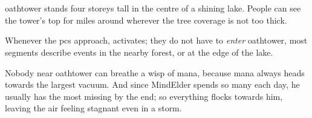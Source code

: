\section{}
\label{oathtower}

\Gls{oathtower} stands four storeys tall in the centre of a shining lake.
People can see the tower's top for miles around wherever the tree coverage is not too thick.

Whenever the \glspl{pc} approach,  activates; they do not have to \emph{enter} \gls{oathtower}, most \glspl{segment} describe events in the nearby forest, or at the edge of the lake.

Nobody near \gls{oathtower} can breathe a wisp of mana, because mana always heads towards the largest vacuum.
And since \gls{MindElder} spends so many  each day, he usually has the most missing by the end; so everything flocks towards him, leaving the air feeling stagnant even in a storm.


